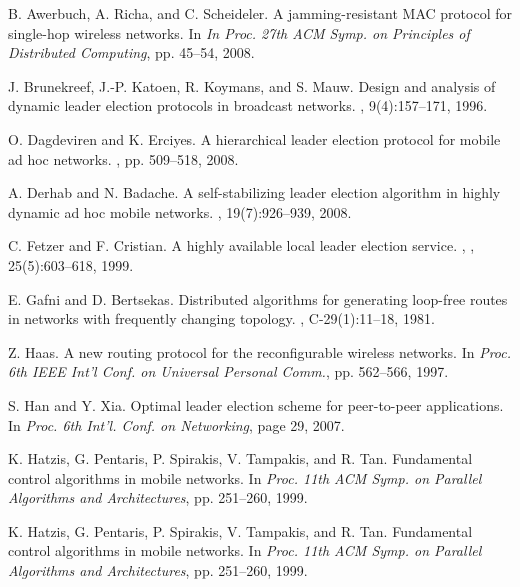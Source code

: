 \documentclass{article}
\begin{document}
\begin{thebibliography}{1}

B. Awerbuch, A. Richa, and C. Scheideler.
\newblock A jamming-resistant MAC protocol for single-hop wireless networks.
\newblock In {\em In Proc. 27th ACM Symp. on Principles of Distributed Computing}, pp. 45–54, 2008.


J. Brunekreef, J.-P. Katoen, R. Koymans, and S. Mauw.
\newblock Design and analysis of dynamic leader election protocols in broadcast networks.
, 9(4):157–171, 1996.

O. Dagdeviren and K. Erciyes.
\newblock A hierarchical leader election protocol for mobile ad hoc networks.
, pp. 509–518, 2008.

A. Derhab and N. Badache.
\newblock A self-stabilizing leader election algorithm in highly dynamic ad hoc mobile networks.
, 19(7):926–939, 2008.

C. Fetzer and F. Cristian.
\newblock A highly available local leader election service.
, , 25(5):603–618, 1999.

E. Gafni and D. Bertsekas.
\newblock Distributed algorithms for generating loop-free routes in networks with frequently changing topology.
, C-29(1):11–18, 1981.

Z. Haas.
\newblock  A new routing protocol for the reconfigurable wireless networks.
\newblock In {\em Proc. 6th IEEE Int’l Conf. on Universal Personal Comm.}, pp. 562–566, 1997.

S. Han and Y. Xia.
\newblock  Optimal leader election scheme for peer-to-peer applications.
\newblock In {\em Proc. 6th Int’l. Conf. on Networking}, page 29, 2007.

K. Hatzis, G. Pentaris, P. Spirakis, V. Tampakis, and R. Tan.
\newblock  Fundamental control algorithms in mobile networks.
\newblock In {\em Proc. 11th ACM Symp. on Parallel Algorithms and Architectures}, pp. 251–260, 1999.

K. Hatzis, G. Pentaris, P. Spirakis, V. Tampakis, and R. Tan.
\newblock  Fundamental control algorithms in mobile networks.
\newblock In {\em Proc. 11th ACM Symp. on Parallel Algorithms and Architectures}, pp. 251–260, 1999.


\end{thebibliography}
\end{document}
